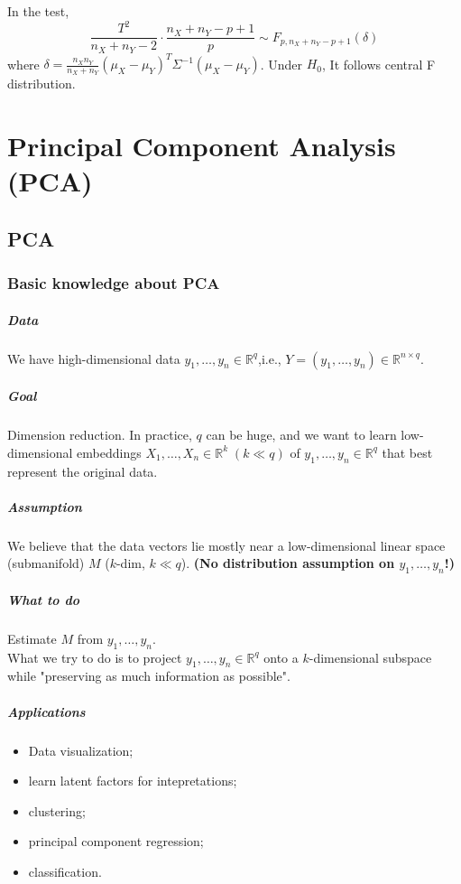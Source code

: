 \documentclass[12pt]{book}
\theoremstyle{definition}
\theoremstyle{remark}
\newcommand{\R}{\mathbb{R}}
\begin{document}
In the test, 
\[\frac{T^2}{n_X+n_Y-2}\cdot \frac{n_X+n_Y-p+1}{p}\sim F_{p,n_X+n_Y-p+1}(\delta)\]
where $\delta = \frac{n_Xn_Y}{n_X+n_Y}(\mu_X-\mu_Y)^T\Sigma^{-1}(\mu_X-\mu_Y)$. Under $H_0$, It follows central F distribution.


\newpage{}
\chapter{Principal Component Analysis (PCA)}
\section{PCA}
\subsection{Basic knowledge about PCA}
\paragraph{Data} We have high-dimensional data $y_1,\dots, y_n\in \R^q$,i.e., $Y = (y_1,\dots, y_n) \in\R^{n\times q}$.
\paragraph{Goal} Dimension reduction. In practice, $q$ can be huge, and we want to learn low-dimensional embeddings $X_1, \dots, X_n\in\R^k \;(k\ll q)$ of $y_1, \dots, y_n\in \R^q$ that best represent the original data. 
\paragraph{Assumption}
We believe that the data vectors lie mostly near a low-dimensional linear space (submanifold) $M$ ($k$-dim, $k\ll q$). \textbf{(No distribution assumption on $y_1,\dots, y_n$!)}
\paragraph{What to do}
Estimate $M$ from $y_1,\dots, y_n$.\\
What we try to do is to project $y_1,\dots, y_n\in \R^q$ onto a $k$-dimensional subspace while "preserving as much information as possible".
\paragraph{Applications}
\begin{itemize}
    \item Data visualization;
    \item learn latent factors for intepretations;
    \item clustering;
    \item principal component regression;
    \item classification.
\end{itemize}
\end{document}
